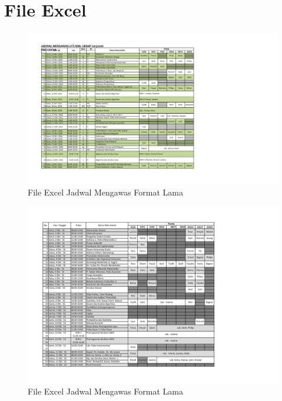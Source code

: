 \chapter{File Excel}
\label{lamp:B}

\begin{figure}[H]
		\centering
		\includegraphics[scale=0.7]{Gambar/JadwalPengawasUjianPakPascal}
		\caption{File Excel Jadwal Mengawas Format Lama}
		\label{fig:formatLama}
\end{figure}

\begin{figure}[H]
		\centering
		\includegraphics[scale=0.7]{Gambar/JadwalPengawasUTS20161}
		\caption{File Excel Jadwal Mengawas Format Lama}
		\label{fig:formatBaru}
\end{figure}

